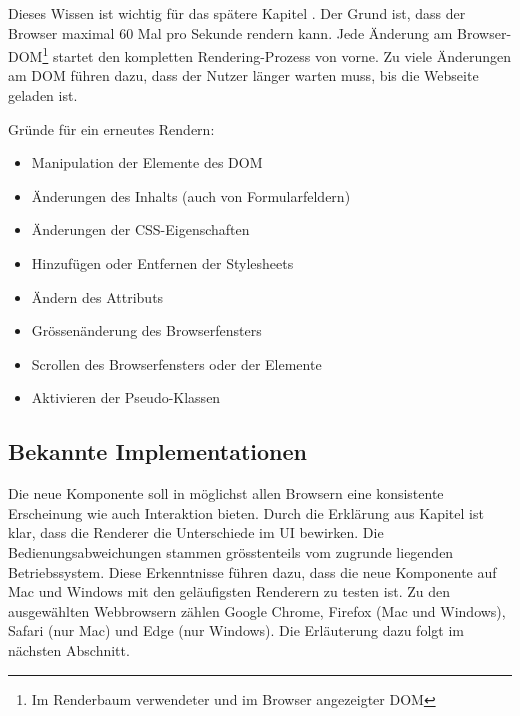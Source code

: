 Dieses Wissen ist wichtig für das spätere Kapitel \textbf{}. 
Der Grund ist, dass der Browser maximal 60 Mal pro Sekunde rendern kann. 
Jede Änderung am Browser-DOM\footnote{
    Im Renderbaum verwendeter und im Browser angezeigter DOM
} startet den kompletten Rendering-Prozess von vorne. 
Zu viele Änderungen am DOM führen dazu, dass der Nutzer länger warten muss, bis die Webseite geladen ist. 

Gründe für ein erneutes Rendern: 

\begin{itemize}
    \item Manipulation der Elemente des DOM
    \item Änderungen des Inhalts (auch von Formularfeldern)
    \item Änderungen der CSS-Eigenschaften
    \item Hinzufügen oder Entfernen der Stylesheets
    \item Ändern des Attributs 
    \item Grössenänderung des Browserfensters
    \item Scrollen des Browserfensters oder der Elemente
    \item Aktivieren der Pseudo-Klassen
\end{itemize}


\subsection{Bekannte Implementationen}
\label{sec:implementationsRenderer}

Die neue Komponente soll in möglichst allen Browsern eine konsistente Erscheinung wie auch Interaktion bieten. 
Durch die Erklärung aus Kapitel \textbf{} ist klar, dass die Renderer die Unterschiede im UI bewirken. 
Die Bedienungsabweichungen stammen grösstenteils vom zugrunde liegenden Betriebssystem. 
Diese Erkenntnisse führen dazu, dass die neue Komponente auf Mac und Windows mit den geläufigsten Renderern zu testen ist. 
Zu den ausgewählten Webbrowsern zählen Google Chrome, Firefox (Mac und Windows), Safari (nur Mac) und Edge (nur Windows). 
Die Erläuterung dazu folgt im nächsten Abschnitt. 

